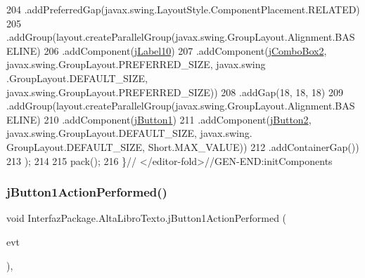 \begin{DoxyCode}
204                 .addPreferredGap(javax.swing.LayoutStyle.ComponentPlacement.RELATED)
205                 .addGroup(layout.createParallelGroup(javax.swing.GroupLayout.Alignment.BASELINE)
206                     .addComponent(\mbox{\hyperlink{class_interfaz_package_1_1_alta_libro_texto_a7a931dd787f522e40bea361927d6bd1b}{jLabel10}})
207                     .addComponent(\mbox{\hyperlink{class_interfaz_package_1_1_alta_libro_texto_a49e7ef058be95fcf124448e008bec61f}{jComboBox2}}, javax.swing.GroupLayout.PREFERRED\_SIZE, javax.swing
      .GroupLayout.DEFAULT\_SIZE, javax.swing.GroupLayout.PREFERRED\_SIZE))
208                 .addGap(18, 18, 18)
209                 .addGroup(layout.createParallelGroup(javax.swing.GroupLayout.Alignment.BASELINE)
210                     .addComponent(\mbox{\hyperlink{class_interfaz_package_1_1_alta_libro_texto_a22a96730cf3c923a67cc8ef92053d06a}{jButton1}})
211                     .addComponent(\mbox{\hyperlink{class_interfaz_package_1_1_alta_libro_texto_a2a68befdaadc6870fcd31afa3214839b}{jButton2}}, javax.swing.GroupLayout.DEFAULT\_SIZE, javax.swing.
      GroupLayout.DEFAULT\_SIZE, Short.MAX\_VALUE))
212                 .addContainerGap())
213         );
214 
215         pack();
216     \}\textcolor{comment}{// </editor-fold>//GEN-END:initComponents}
\end{DoxyCode}
\mbox{\label{class_interfaz_package_1_1_alta_libro_texto_a204c99e523c784bfa4c61c55bd7d005a}} 
\subsubsection{\texorpdfstring{j\+Button1\+Action\+Performed()}{jButton1ActionPerformed()}}
{\footnotesize\ttfamily void Interfaz\+Package.\+Alta\+Libro\+Texto.\+j\+Button1\+Action\+Performed (\begin{DoxyParamCaption}\item[{java.\+awt.\+event.\+Action\+Event}]{evt }\end{DoxyParamCaption})\hspace{0.3cm}{\ttfamily [inline]}, {\ttfamily [private]}}



